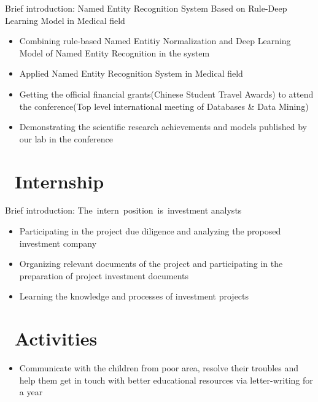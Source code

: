 \documentclass{resume}
\begin{document}
Brief introduction: Named Entity Recognition System Based on Rule-Deep Learning Model in Medical field
\begin{itemize}
  \item Combining rule-based Named Entitiy Normalization and Deep Learning Model of Named Entity Recognition in the system
  \item Applied Named Entity Recognition System in Medical field
\end{itemize}

\begin{itemize}
  \item Getting the official financial grants(Chinese Student Travel Awards) to attend the conference(Top level international meeting of Databases & Data Mining) 
  \item Demonstrating the scientific research achievements and models published by our lab in the conference
\end{itemize}


\section{\faCogs\ Internship}
Brief introduction: The intern position is investment analysts
\begin{itemize}
  \item Participating in the project due diligence and analyzing the proposed investment company
  \item Organizing relevant documents of the project and participating in the preparation of project investment documents
  \item Learning the knowledge and processes of investment projects
\end{itemize}

\section{\faHeartO\ Activities}
\begin{itemize}
  \item Communicate with the children from poor area, resolve their troubles and help them get in touch with better educational resources via letter-writing for a year
\end{itemize}
\end{document}
